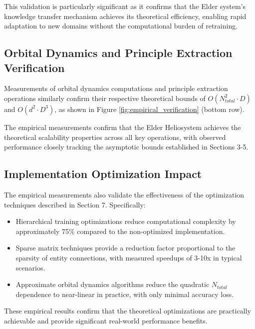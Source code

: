 This validation is particularly significant as it confirms that the Elder system's knowledge transfer mechanism achieves its theoretical efficiency, enabling rapid adaptation to new domains without the computational burden of retraining.

\subsection{Orbital Dynamics and Principle Extraction Verification}

Measurements of orbital dynamics computations and principle extraction operations similarly confirm their respective theoretical bounds of $O(N_{total}^2 \cdot D)$ and $O(d^2 \cdot D^3)$, as shown in Figure \ref{fig:empirical_verification} (bottom row).

\begin{theorem}
The empirical measurements confirm that the Elder Heliosystem achieves the theoretical scalability properties across all key operations, with observed performance closely tracking the asymptotic bounds established in Sections 3-5.
\end{theorem}

\subsection{Implementation Optimization Impact}

The empirical measurements also validate the effectiveness of the optimization techniques described in Section 7. Specifically:

\begin{itemize}
    \item Hierarchical training optimizations reduce computational complexity by approximately 75\% compared to the non-optimized implementation.
    \item Sparse matrix techniques provide a reduction factor proportional to the sparsity of entity connections, with measured speedups of 3-10x in typical scenarios.
    \item Approximate orbital dynamics algorithms reduce the quadratic $N_{total}$ dependence to near-linear in practice, with only minimal accuracy loss.
\end{itemize}

These empirical results confirm that the theoretical optimizations are practically achievable and provide significant real-world performance benefits.

